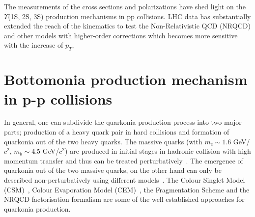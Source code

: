 The measurements of the cross sections and polarizations have shed light on the
$\Upsilon$(1S, 2S, 3S) production mechanisms in pp collisions.
LHC data has substantially extended the reach of the kinematics to test the Non-Relativistic QCD (NRQCD)
and other models with
higher-order corrections which becomes more sensitive with the increase of $p_{T}$,


















\section{Bottomonia production mechanism in p-p collisions}
\label{sec:Bottomonia_pp_th}


In general, one can subdivide the quarkonia production process into two major parts;
production of a heavy quark pair in hard collisions and formation of quarkonia
out of the two heavy quarks.
  The massive quarks (with $m_c\sim 1.6$ GeV/$c^2$, $m_b\sim 4.5$ GeV/$c^2$) are produced
in initial stages in hadronic collision with high momentum transfer and thus
can be treated perturbatively~\cite{Nason:1989zy}. The emergence of quarkonia
out of the two massive quarks, on the other hand can only be described non-perturbatively using different
models~\cite{Bodwin:1994jh,Brambilla:2014jmp}.
The Colour Singlet Model (CSM)~\cite{Einhorn:1975ua,Berger:1980ni},
Colour Evaporation Model (CEM)~\cite{Fritzsch:1977ay,Amundson:1995em}, the Fragmentation Scheme and 
the NRQCD factorisation formalism are some of the well established approaches for quarkonia production.


